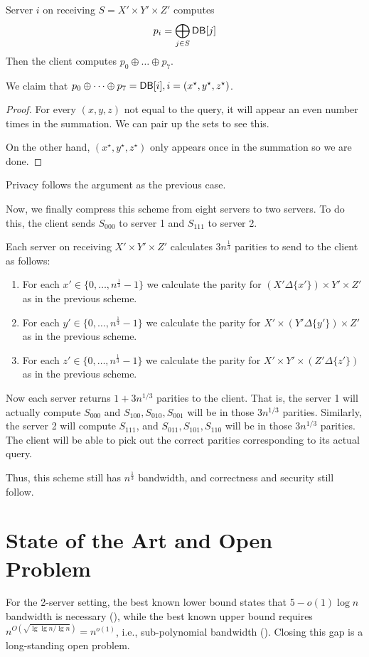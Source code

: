 		Server $i$ on receiving $S = X' \times Y' \times Z'$ computes 
			\[p_{i} = \bigoplus_{j \in S} {\sf DB}[j]\]
		Then the client computes $p_0 \oplus \dots \oplus p_7$. 

		We claim that $p_0 \oplus \dots \oplus p_7 = {\sf DB}[i], i = (x^\star, y^\star, z^\star)$.
		\begin{proof}
		For every $(x,y,z)$ not equal to the query, it will appear an even number times in the summation. We can pair up the sets to see this. 

		On the other hand, $(x^\star, y^\star, z^\star)$ only appears once in the summation so we are done.
		\end{proof}

		Privacy follows the argument as the previous case. 

Now, we finally compress this scheme from eight servers to two servers. To do this, the client sends $S_{000}$ to server 1 and $S_{111}$ to server 2.

Each server on receiving $X' \times Y' \times Z'$ calculates $3 n^{\frac1 3}$ parities to send to the client as follows:
\begin{enumerate}
	\item For each $x' \in \{0,\dots,n^{\frac 1 3} - 1\}$ we calculate the parity for $(X' \Delta \{x'\}) \times Y' \times  Z'$ as in the previous scheme.
	\item For each $y' \in \{0,\dots,n^{\frac 1 3} - 1\}$ we calculate the parity for $X' \times (Y' \Delta \{y'\}) \times  Z'$ as in the previous scheme.
	\item For each $z' \in \{0,\dots,n^{\frac 1 3} - 1\}$ we calculate the parity for $X' \times Y' \times  (Z' \Delta \{z'\})$ as in the previous scheme.
\end{enumerate}

Now each server returns $1+3n^{1/3}$ parities to the client.
That is, the server 1 will actually compute $S_{000}$ and $S_{100}, S_{010}, S_{001}$ will be in those $3n^{1/3}$ parities. 
Similarly, the server 2 will compute $S_{111}$, and $S_{011},S_{101},S_{110}$ will be in those $3n^{1/3}$ parities.
The client will be able to pick out the correct parities corresponding to its actual query.

Thus, this scheme still has $n^{\frac 1 3}$ bandwidth, and correctness and security still follow.

\section{State of the Art and Open Problem}
	For the 2-server setting, the best
known lower bound states that $5 - o(1)\log n$ bandwidth is necessary (\cite{WdW05}),  while the best known upper bound requires 
	$n^{O\left(\sqrt{\lg \lg n / \lg n}\right)} = n^{o(1)}$, i.e., 
sub-polynomial
bandwidth (\cite{dvir20162}). Closing this gap is a long-standing open problem. 


